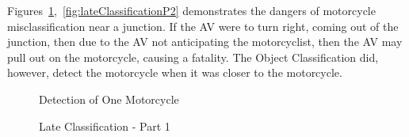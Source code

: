 \documentclass[12pt]{report} %
\begin{document}
    Figures~\ref{fig:lateClassificationP1},~\ref{fig:lateClassificationP2} demonstrates the dangers of motorcycle misclassification near a junction. If the AV were to turn right, coming out of the junction, then due to the AV not anticipating the motorcyclist, then the AV may pull out on the motorcycle, causing a fatality. The Object Classification did, however, detect the motorcycle when it was closer to the motorcycle.
	\begin{figure}[h]
		\begin{floatrow}
			{
				\caption{Detection of One Motorcycle}
				\label{fig:detectionOfOneMotorcycle}
			}
		
			{
				\caption{Late Classification - Part 1}
				\label{fig:lateClassificationP1}
			}
		

\end{floatrow}
\end{figure}
\end{document}
